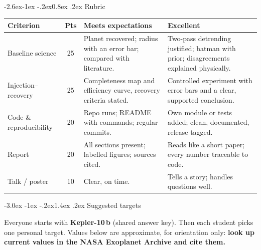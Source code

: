 \documentclass[11pt,a4paper]{article}
\makeatletter
\renewcommand\section{\@startsection{section}{1}{\z@}%
  {-3.0ex \@plus -1ex \@minus -.2ex}{1.4ex \@plus .2ex}%
  {\normalfont\sffamily\LARGE\bfseries\color{navy}}}
\renewcommand\subsection{\@startsection{subsection}{2}{\z@}%
  {-2.6ex\@plus -1ex \@minus -.2ex}{0.8ex \@plus .2ex}%
  {\normalfont\sffamily\Large\bfseries\color{navy}}}
\makeatother
\begin{document}
\subsection{Rubric}
\begin{center}
\small
\begin{tabularx}{\linewidth}{@{}L{3.2cm} c Y Y@{}}
\toprule
\textbf{Criterion} & \textbf{Pts} & \textbf{Meets expectations} & \textbf{Excellent}\\
\midrule
Baseline science & 25 & Planet recovered; radius with an error bar; compared with literature. & Two-pass detrending justified; batman with prior; disagreements explained physically.\\
Injection--recovery & 25 & Completeness map and efficiency curve, recovery criteria stated. & Controlled experiment with error bars and a clear, supported conclusion.\\
Code \& reproducibility & 20 & Repo runs; README with commands; regular commits. & Own module or tests added; clean, documented, release tagged.\\
Report & 20 & All sections present; labelled figures; sources cited. & Reads like a short paper; every number traceable to code.\\
Talk / poster & 10 & Clear, on time. & Tells a story; handles questions well.\\
\bottomrule
\end{tabularx}
\end{center}

\clearpage
\section{Suggested targets}
\label{sec:targets}

Everyone starts with \textbf{Kepler-10\,b} (shared answer key). Then each student picks one personal target. Values below are
approximate, for orientation only: \textbf{look up current values in the NASA Exoplanet Archive and cite them.}
\end{document}
